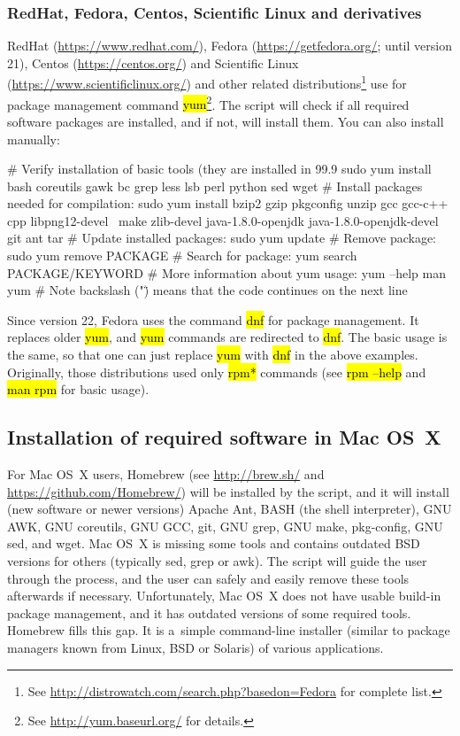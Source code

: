 \documentclass[a4paper, 11pt, twoside]{article}
\renewcommand{\texttt}[1]{\hl{\ttfamily #1}}
\begin{document}
\subsubsection{RedHat, Fedora, Centos, Scientific Linux and derivatives}

RedHat (\url{https://www.redhat.com/}), Fedora (\url{https://getfedora.org/}; until version 21), Centos (\url{https://centos.org/}) and Scientific Linux (\url{https://www.scientificlinux.org/}) and other related distributions\footnote{See \url{http://distrowatch.com/search.php?basedon=Fedora} for complete list.} use for package management command \texttt{yum}\footnote{See \url{http://yum.baseurl.org/} for details.}. The script will check if all required software packages are installed, and if not, will install them. You can also install manually:

\begin{bashcode}
  # Verify installation of basic tools (they are installed in 99.9%
  sudo yum install bash coreutils gawk bc grep less lsb perl python sed wget
  # Install packages needed for compilation:
  sudo yum install bzip2 gzip pkgconfig unzip gcc gcc-c++ cpp libpng12-devel \
    make zlib-devel java-1.8.0-openjdk java-1.8.0-openjdk-devel git ant tar
  # Update installed packages:
  sudo yum update
  # Remove package:
  sudo yum remove PACKAGE
  # Search for package:
  yum search PACKAGE/KEYWORD
  # More information about yum usage:
  yum --help
  man yum
  # Note backslash ("\") means that the code continues on the next line
\end{bashcode}

Since version 22, Fedora uses the command \texttt{dnf} for package management. It replaces older \texttt{yum}, and \texttt{yum} commands are redirected to \texttt{dnf}. The basic usage is the same, so that one can just replace \texttt{yum} with \texttt{dnf} in the above examples. Originally, those distributions used only \texttt{rpm*} commands (see \texttt{rpm --help} and \texttt{man rpm} for basic usage).

\subsection{Installation of required software in Mac OS~X}
\label{required-mac}

For Mac OS~X users, Homebrew (see \url{http://brew.sh/} and \url{https://github.com/Homebrew/}) will be installed by the script, and it will install (new software or newer versions) Apache Ant, BASH (the shell interpreter), GNU AWK, GNU coreutils, GNU GCC, git, GNU grep, GNU make, pkg-config, GNU sed, and wget. Mac OS~X is missing some tools and contains outdated BSD versions for others (typically sed, grep or awk). The script will guide the user through the process, and the user can safely and easily remove these tools afterwards if necessary. Unfortunately, Mac OS~X does not have usable build-in package management, and it has outdated versions of some required tools. Homebrew fills this gap. It is a~simple command-line installer (similar to package managers known from Linux, BSD or Solaris) of various applications.
\end{document}
